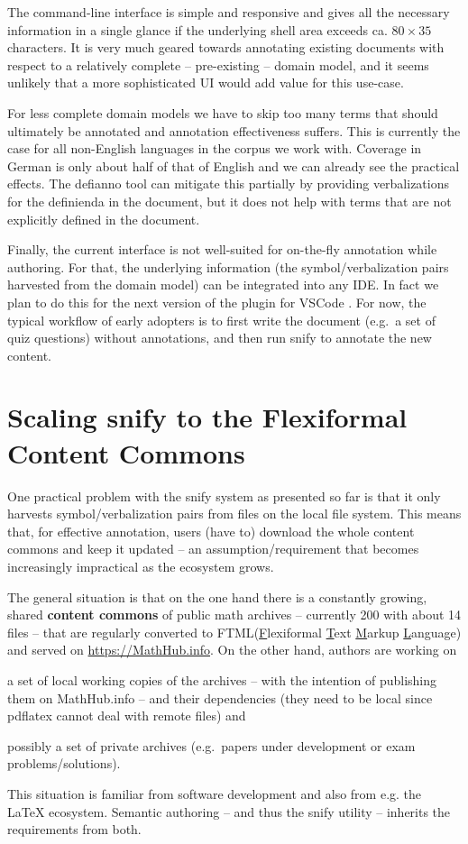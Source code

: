 \documentclass[runningheads]{llncs}
\newcommand\snify{\textsf{snify}\xspace}
\newcommand\defianno{\textsf{defianno}\xspace}
\newcommand\FTML{\textsf{FTML}\xspace}
\begin{document}
The command-line interface is simple and responsive and gives all the necessary
information in a single glance if the underlying shell area exceeds ca. $80\times 35$
characters. It is very much geared towards annotating existing documents with respect to a
relatively complete -- pre-existing -- domain model, and it seems unlikely that a more
sophisticated UI would add value for this use-case.

For less complete domain models we have to skip too many terms that should ultimately be
annotated and annotation effectiveness suffers. This is currently the case for all
non-English languages in the \sTeX corpus we work with. Coverage in German is only about
half of that of English and we can already see the practical effects.  The \defianno tool
can mitigate this partially by providing verbalizations for
the definienda in the document, but it does not help with terms that are not explicitly
defined in the document.

Finally, the current interface is not well-suited for on-the-fly annotation while
authoring.
For that, the underlying information (the symbol/verbalization pairs harvested
from the domain model) can be integrated into any IDE. In fact we plan to do this for the
next version of the \sTeX plugin for VSCode \cite{sTeX-IDE:git}.
For now, the typical workflow of early adopters is to first write the document (e.g.\ a set of quiz questions) without annotations, and then run \snify to annotate the new content.

\section{Scaling \snify to the Flexiformal Content Commons }\label{sec:scaling}
One practical problem with the \snify system as presented so far is that it only harvests
symbol/verbalization pairs from \sTeX files on the local file system. This means that, for
effective annotation, users (have to) download the whole content commons and keep it
updated -- an assumption/requirement that becomes increasingly impractical as the \sTeX
ecosystem grows.

The general situation is that on the one hand there is a constantly growing, shared
\textbf{content commons} of public math archives -- currently 200 with about 14 \sTeX
files -- that are regularly converted to \FTML (\underline{F}lexiformal \underline{T}ext
\underline{M}arkup \underline{L}anguage) and served on \url{https://MathHub.info}. On the
other hand, authors are working on
\begin{compactenum}[\em i\rm)]
\item a set of local working copies of the archives -- with the intention of publishing
  them on MathHub.info -- and their dependencies (they need to be local since
  \textsf{pdflatex} cannot deal with remote files) and
\item possibly a set of private archives (e.g.\ papers under development or exam
  problems/solutions).
\end{compactenum}
This situation is familiar from software development and also from e.g. the \LaTeX{}
ecosystem. Semantic authoring -- and thus the \snify utility -- inherits the requirements
from both.
\end{document}

